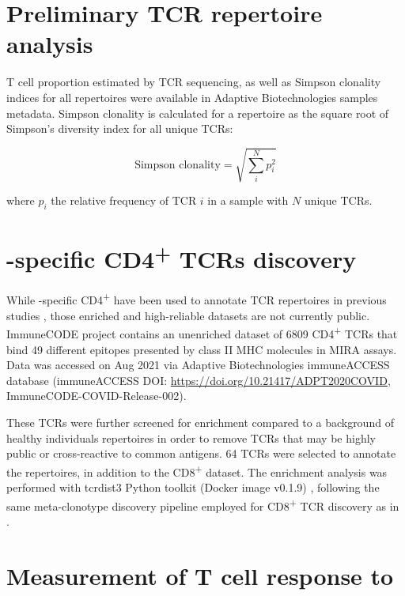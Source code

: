 \section*{Preliminary TCR repertoire analysis}


T cell proportion estimated by TCR sequencing, as well as Simpson clonality indices for all repertoires were available in Adaptive Biotechnologies samples metadata. Simpson clonality is calculated for a repertoire as the square root of Simpson’s diversity index for all unique TCRs:


\[ \mbox{Simpson clonality} = \sqrt{\sum_{i}^N p_{i}^2} \]

where $p_{i}$ the relative frequency of TCR $i$ in a sample with $N$ unique TCRs.


\section*{\covid-specific CD4\textsuperscript{+} TCRs discovery}


While \covid-specific CD4\textsuperscript{+} have been used to annotate TCR repertoires in previous studies \citep{janssen, snyderdiagnosis}, those enriched and high-reliable datasets are not currently public. ImmuneCODE\texttrademark{} project contains an unenriched dataset of 6809 CD4\textsuperscript{+} TCRs that bind 49 different \covid{} epitopes presented by class II MHC molecules in MIRA assays. Data was accessed on Aug 2021 via Adaptive Biotechnologies immuneACCESS\textregistered{} database (immuneACCESS\textregistered{} DOI: \url{https://doi.org/10.21417/ADPT2020COVID}, ImmuneCODE-COVID-Release-002).

These TCRs were further screened for enrichment compared to a background of healthy individuals repertoires in order to remove TCRs that may be highly public or cross-reactive to common antigens. 64 TCRs were selected to annotate the repertoires, in addition to the CD8\textsuperscript{+} dataset. The enrichment analysis was performed with tcrdist3 Python toolkit (Docker image v0.1.9) \citep{metaclonotypes, tcrdist}, following the same meta-clonotype discovery pipeline employed for \covid{} CD8\textsuperscript{+} TCR discovery as in \cite{metaclonotypes}.



\section*{Measurement of T cell response to \covid}


